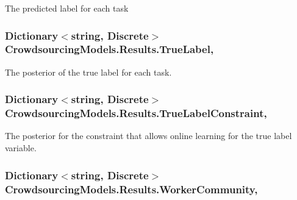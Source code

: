The predicted label for each task 

\hypertarget{class_crowdsourcing_models_1_1_results_a140d71795dcea434130891de21d6747b}{}
\subsubsection[{True\+Label}]{\setlength{\rightskip}{0pt plus 5cm}Dictionary$<$string, Discrete$>$ Crowdsourcing\+Models.\+Results.\+True\+Label\hspace{0.3cm}{\ttfamily [get]}, {}}\label{class_crowdsourcing_models_1_1_results_a140d71795dcea434130891de21d6747b}


The posterior of the true label for each task. 

\hypertarget{class_crowdsourcing_models_1_1_results_a63c41834f4a0f9ecf4403594ae2f2cdc}{}
\subsubsection[{True\+Label\+Constraint}]{\setlength{\rightskip}{0pt plus 5cm}Dictionary$<$string, Discrete$>$ Crowdsourcing\+Models.\+Results.\+True\+Label\+Constraint\hspace{0.3cm}{\ttfamily [get]}, {}}\label{class_crowdsourcing_models_1_1_results_a63c41834f4a0f9ecf4403594ae2f2cdc}


The posterior for the constraint that allows online learning for the true label variable. 

\hypertarget{class_crowdsourcing_models_1_1_results_a898393862d585cafb14aa6a2d617641e}{}
\subsubsection[{Worker\+Community}]{\setlength{\rightskip}{0pt plus 5cm}Dictionary$<$string, Discrete$>$ Crowdsourcing\+Models.\+Results.\+Worker\+Community\hspace{0.3cm}{\ttfamily [get]}, {}}\label{class_crowdsourcing_models_1_1_results_a898393862d585cafb14aa6a2d617641e}


